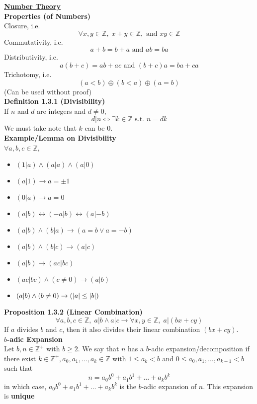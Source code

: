 \documentclass[a4paper]{article}
\newcommand{\heading}[1]{{\small\underline{\textbf{#1}}}}
\newcommand{\subheading}[1]{{\scriptsize\textbf{#1}}}
\begin{document}
\begin{multicols*}{4}
\heading{Number Theory} \\

\subheading{Properties (of Numbers)} \\
Closure, i.e.
$$\forall x, y \in \mathbb{Z},\;
x + y \in \mathbb{Z},\text{ and }
xy \in \mathbb{Z}$$
Commutativity, i.e.
$$a+b=b+a\text{ and }ab=ba$$
Distributivity, i.e.
$$a(b+c) = ab + ac \text{ and } (b+c)a = ba + ca$$
Trichotomy, i.e.
$$(a < b) \oplus (b < a) \oplus (a = b)$$
(Can be used without proof)\\

\subheading{Definition 1.3.1 (Divisibility)}\\
If $n$ and $d$ are integers and $d \neq 0$,
$$ d|n \iff \exists k \in \mathbb{Z} \text{ s.t. } n=dk $$
We must take note that $k$ can be 0. \\

\subheading{Example/Lemma on Divisibility}\\
$\forall a, b, c \in \mathbb{Z}$,
\begin{itemize}[leftmargin=*] \itemsep -0.3em
	\item $(1 | a) \land (a | a) \land (a | 0)$
	\item $(a | 1) \rightarrow a = \pm 1$
	\item $(0 | a) \rightarrow a = 0$
	\item $(a | b) \leftrightarrow (-a | b) \leftrightarrow (a | -b)$
	\item $(a | b) \land (b | a) \rightarrow (a = b \lor a = -b)$
	\item $(a | b) \land (b | c) \rightarrow (a | c)$
	\item $(a | b) \rightarrow (ac | bc)$
	\item $(ac | bc) \land (c \ne 0) \rightarrow (a | b)$
	\item $(a | b) \land (b \ne 0) \rightarrow (\abs{a} \leq \abs{b})$
\end{itemize}

\subheading{Proposition 1.3.2 (Linear Combination)}
$$\forall a, b, c \in \mathbb{Z},\;
a | b \land a | c \rightarrow
\forall x, y \in \mathbb{Z},\;
a | (bx + cy)$$
If $a$ divides $b$ and $c$, then it also divides their linear combination
$(bx + cy)$.\\

\subheading{$b$-adic Expansion} \\
Let $b, n \in \mathbb{Z}^+$ with $b \geq 2$. We say that $n$ has a $b$-adic expansion/decomposition if there exist $k \in \mathbb{Z}^+, a_0, a_1, \dots, a_k \in \mathbb{Z}$ with $1 \leq a_k < b$ and $0 \leq a_0, a_1, \dots, a_{k-1} < b$ such that
$$n = a_0b^0 + a_1b^1 + \dots + a_kb^k$$
in which case, $a_0b^0 + a_1b^1 + \dots + a_kb^k$ is the $b$-adic expansion of $n$. This expansion is \textbf{unique}\\


\end{multicols*}
\end{document}
